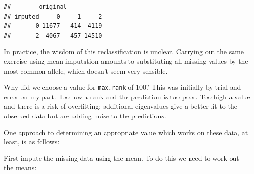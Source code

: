 \documentclass[
]{book}
\newenvironment{Shaded}{\begin{snugshade}}{\end{snugshade}}
\newcommand{\AttributeTok}[1]{\textcolor[rgb]{0.77,0.63,0.00}{#1}}
\newcommand{\CommentTok}[1]{\textcolor[rgb]{0.56,0.35,0.01}{\textit{#1}}}
\newcommand{\ControlFlowTok}[1]{\textcolor[rgb]{0.13,0.29,0.53}{\textbf{#1}}}
\newcommand{\DecValTok}[1]{\textcolor[rgb]{0.00,0.00,0.81}{#1}}
\newcommand{\FloatTok}[1]{\textcolor[rgb]{0.00,0.00,0.81}{#1}}
\newcommand{\FunctionTok}[1]{\textcolor[rgb]{0.00,0.00,0.00}{#1}}
\newcommand{\NormalTok}[1]{#1}
\newcommand{\OtherTok}[1]{\textcolor[rgb]{0.56,0.35,0.01}{#1}}
\newcommand{\SpecialCharTok}[1]{\textcolor[rgb]{0.00,0.00,0.00}{#1}}
\begin{document}
\begin{verbatim}
##        original
## imputed     0     1     2
##       0 11677   414  4119
##       2  4067   457 14510
\end{verbatim}

In practice, the wisdom of this reclassification is unclear. Carrying out the same exercise using mean imputation amounts to substituting all missing values by the most common allele, which doesn't seem very sensible.

Why did we choose a value for \texttt{max.rank} of 100? This was initially by trial and error on my part. Too low a rank and the prediction is too poor. Too high a value and there is a risk of overfitting: additional eigenvalues give a better fit to the observed data but are adding noise to the predictions.

One approach to determining an appropriate value which works on these data, at least, is as follows:

First impute the missing data using the mean. To do this we need to work out the means:

\begin{Shaded}
\end{Shaded}
\end{document}
